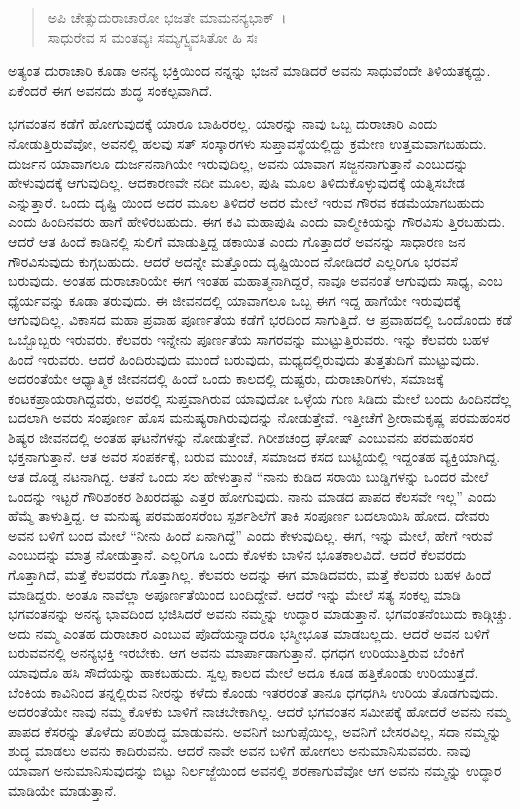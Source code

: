 \begin{verse}
ಅಪಿ ಚೇತ್ಸುದುರಾಚಾರೋ ಭಜತೇ ಮಾಮನನ್ಯಭಾಕ್~।\\ಸಾಧುರೇವ ಸ ಮಂತವ್ಯಃ ಸಮ್ಯಗ್ವ್ಯವಸಿತೋ ಹಿ ಸಃ 
\end{verse}

{\small ಅತ್ಯಂತ ದುರಾಚಾರಿ ಕೂಡಾ ಅನನ್ಯ ಭಕ್ತಿಯಿಂದ ನನ್ನನ್ನು ಭಜನೆ ಮಾಡಿದರೆ ಅವನು ಸಾಧುವೆಂದೇ ತಿಳಿಯತಕ್ಕದ್ದು. ಏಕೆಂದರೆ ಈಗ ಅವನದು ಶುದ್ಧ ಸಂಕಲ್ಪವಾಗಿದೆ.}

ಭಗವಂತನ ಕಡೆಗೆ ಹೋಗುವುದಕ್ಕೆ ಯಾರೂ ಬಾಹಿರರಲ್ಲ. ಯಾರನ್ನು ನಾವು ಒಬ್ಬ ದುರಾಚಾರಿ ಎಂದು ನೋಡುತ್ತಿರುವೆವೋ, ಅವನಲ್ಲಿ ಹಲವು ಸತ್ ಸಂಸ್ಕಾರಗಳು ಸುಪ್ತಾವಸ್ಥೆಯಲ್ಲಿದ್ದು ಕ್ರಮೇಣ ಉತ್ತಮವಾಗಬಹುದು. ದುರ್ಜನ ಯಾವಾಗಲೂ ದುರ್ಜನನಾಗಿಯೇ ಇರುವುದಿಲ್ಲ, ಅವನು ಯಾವಾಗ ಸಜ್ಜನನಾಗುತ್ತಾನೆ ಎಂಬುದನ್ನು ಹೇಳುವುದಕ್ಕೆ ಆಗುವುದಿಲ್ಲ. ಆದಕಾರಣವೇ ನದೀ ಮೂಲ, ಪುಷಿ ಮೂಲ ತಿಳಿದುಕೊಳ್ಳುವುದಕ್ಕೆ ಯತ್ನಿಸಬೇಡ ಎನ್ನುತ್ತಾರೆ. ಒಂದು ದೃಷ್ಟಿ ಯಿಂದ ಅದರ ಮೂಲ ತಿಳಿದರೆ ಅದರ ಮೇಲೆ ಇರುವ ಗೌರವ ಕಡಮೆಯಾಗಬಹುದು ಎಂದು ಹಿಂದಿನವರು ಹಾಗೆ ಹೇಳಿರಬಹುದು. ಈಗ ಕವಿ ಮಹಾಪುಷಿ ಎಂದು ವಾಲ್ಮೀಕಿಯನ್ನು ಗೌರವಿಸು ತ್ತಿರಬಹುದು. ಆದರೆ ಆತ ಹಿಂದೆ ಕಾಡಿನಲ್ಲಿ ಸುಲಿಗೆ ಮಾಡುತ್ತಿದ್ದ ಡಕಾಯಿತ ಎಂದು ಗೊತ್ತಾದರೆ ಅವನನ್ನು ಸಾಧಾರಣ ಜನ ಗೌರವಿಸುವುದು ಕುಗ್ಗಬಹುದು. ಆದರೆ ಅದನ್ನೇ ಮತ್ತೊಂದು ದೃಷ್ಟಿಯಿಂದ ನೋಡಿದರೆ ಎಲ್ಲರಿಗೂ ಭರವಸೆ ಬರುವುದು. ಅಂತಹ ದುರಾಚಾರಿಯೇ ಈಗ ಇಂತಹ ಮಹಾತ್ಮನಾಗಿದ್ದರೆ, ನಾವೂ ಅವನಂತೆ ಆಗುವುದು ಸಾಧ್ಯ, ಎಂಬ ಧ್ಯೆರ್ಯವನ್ನು ಕೂಡಾ ತರುವುದು. ಈ ಜೀವನದಲ್ಲಿ ಯಾವಾಗಲೂ ಒಬ್ಬ ಈಗ ಇದ್ದ ಹಾಗೆಯೇ ಇರುವುದಕ್ಕೆ ಆಗುವುದಿಲ್ಲ. ವಿಕಾಸದ ಮಹಾ ಪ್ರವಾಹ ಪೂರ್ಣತೆಯ ಕಡೆಗೆ ಭರದಿಂದ ಸಾಗುತ್ತಿದೆ. ಆ ಪ್ರವಾಹದಲ್ಲಿ ಒಂದೊಂದು ಕಡೆ ಒಬ್ಬೊಬ್ಬರು ಇರುವರು. ಕೆಲವರು ಇನ್ನೇನು ಪೂರ್ಣತೆಯ ಸಾಗರವನ್ನು ಮುಟ್ಟುತ್ತಿರುವರು. ಇನ್ನು ಕೆಲವರು ಬಹಳ ಹಿಂದೆ ಇರುವರು. ಆದರೆ ಹಿಂದಿರುವುದು ಮುಂದೆ ಬರುವುದು, ಮಧ್ಯದಲ್ಲಿರುವುದು ತುತ್ತತುದಿಗೆ ಮುಟ್ಟುವುದು. ಅದರಂತೆಯೇ ಆಧ್ಯಾತ್ಮಿಕ ಜೀವನದಲ್ಲಿ ಹಿಂದೆ ಒಂದು ಕಾಲದಲ್ಲಿ ದುಷ್ಟರು, ದುರಾಚಾರಿಗಳು, ಸಮಾಜಕ್ಕೆ ಕಂಟಕಪ್ರಾಯರಾಗಿದ್ದವರು, ಅವರಲ್ಲಿ ಸುಪ್ತವಾಗಿರುವ ಯಾವುದೋ ಒಳ್ಳೆಯ ಗುಣ ಸಿಡಿದು ಮೇಲೆ ಬಂದು ಹಿಂದಿನದೆಲ್ಲ ಬದಲಾಗಿ ಅವರು ಸಂಪೂರ್ಣ ಹೊಸ ಮನುಷ್ಯರಾಗಿರುವುದನ್ನು ನೋಡುತ್ತೇವೆ. ಇತ್ತೀಚೆಗೆ ಶ‍್ರೀರಾಮಕೃಷ್ಣ ಪರಮಹಂಸರ ಶಿಷ್ಯರ ಜೀವನದಲ್ಲಿ ಅಂತಹ ಘಟನೆಗಳನ್ನು ನೋಡುತ್ತೇವೆ. ಗಿರೀಶಚಂದ್ರ ಘೋಷ್ ಎಂಬುವನು ಪರಮಹಂಸರ ಭಕ್ತನಾಗುತ್ತಾನೆ. ಆತ ಅವರ ಸಂಪರ್ಕಕ್ಕೆ, ಬರುವ ಮುಂಚೆ, ಸಮಾಜದ ಕಸದ ಬುಟ್ಟಿಯಲ್ಲಿ ಇದ್ದಂತಹ ವ್ಯಕ್ತಿಯಾಗಿದ್ದ. ಆತ ದೊಡ್ಡ ನಟನಾಗಿದ್ದ. ಆತನೆ ಒಂದು ಸಲ ಹೇಳುತ್ತಾನೆ “ನಾನು ಕುಡಿದ ಸರಾಯಿ ಬುಡ್ಡಿಗಳನ್ನು ಒಂದರ ಮೇಲೆ ಒಂದನ್ನು ಇಟ್ಟರೆ ಗೌರಿಶಂಕರ ಶಿಖರದಷ್ಟು ಎತ್ತರ ಹೋಗುವುದು. ನಾನು ಮಾಡದ ಪಾಪದ ಕೆಲಸವೇ ಇಲ್ಲ” ಎಂದು ಹೆಮ್ಮೆ ತಾಳುತ್ತಿದ್ದ. ಆ ಮನುಷ್ಯ ಪರಮಹಂಸರೆಂಬ ಸ್ಪರ್ಶಶಿಲೆಗೆ ತಾಕಿ ಸಂಪೂರ್ಣ ಬದಲಾಯಿಸಿ ಹೋದ. ದೇವರು ಅವನ ಬಳಿಗೆ ಬಂದ ಮೇಲೆ “ನೀನು ಹಿಂದೆ ಏನಾಗಿದ್ದೆ” ಎಂದು ಕೇಳುವುದಿಲ್ಲ. ಈಗ, ಇನ್ನು ಮೇಲೆ, ಹೇಗೆ ಇರುವೆ ಎಂಬುದನ್ನು ಮಾತ್ರ ನೋಡುತ್ತಾನೆ. ಎಲ್ಲರಿಗೂ ಒಂದು ಕೊಳಕು ಬಾಳಿನ ಭೂತಕಾಲವಿದೆ. ಆದರೆ ಕೆಲವರದು ಗೊತ್ತಾಗಿದೆ, ಮತ್ತೆ ಕೆಲವರದು ಗೊತ್ತಾಗಿಲ್ಲ. ಕೆಲವರು ಅದನ್ನು ಈಗ ಮಾಡಿದವರು, ಮತ್ತೆ ಕೆಲವರು ಬಹಳ ಹಿಂದೆ ಮಾಡಿದ್ದರು. ಅಂತೂ ನಾವೆಲ್ಲಾ ಅಪೂರ್ಣತೆಯಿಂದ ಬಂದಿದ್ದೇವೆ. ಆದರೆ ಇನ್ನು ಮೇಲೆ ಸತ್ಯ ಸಂಕಲ್ಪ ಮಾಡಿ ಭಗವಂತನನ್ನು ಅನನ್ಯ ಭಾವದಿಂದ ಭಜಿಸಿದರೆ ಅವನು ನಮ್ಮನ್ನು ಉದ್ಧಾರ ಮಾಡುತ್ತಾನೆ. ಭಗವಂತನೆಂಬುದು ಕಾಡ್ಗಿಚ್ಚು. ಅದು ನಮ್ಮ ಎಂತಹ ದುರಾಚಾರ ಎಂಬುವ ಪೊದೆಯನ್ನಾದರೂ ಭಸ್ಮೀಭೂತ ಮಾಡಬಲ್ಲದು. ಆದರೆ ಅವನ ಬಳಿಗೆ ಬರುವವನಲ್ಲಿ ಅನನ್ಯಭಕ್ತಿ ಇರಬೇಕು. ಆಗ ಅವನು ಮಾರ್ಪಾಡಾಗುತ್ತಾನೆ. ಧಗಧಗ ಉರಿಯುತ್ತಿರುವ ಬೆಂಕಿಗೆ ಯಾವುದೊ ಹಸಿ ಸೌದೆಯನ್ನು ಹಾಕಬಹುದು. ಸ್ವಲ್ಪ ಕಾಲದ ಮೇಲೆ ಅದೂ ಕೂಡ ಹತ್ತಿಕೊಂಡು ಉರಿಯುತ್ತದೆ. ಬೆಂಕಿಯ ಕಾವಿನಿಂದ ತನ್ನಲ್ಲಿರುವ ನೀರನ್ನು ಕಳೆದು ಕೊಂಡು ಇತರರಂತೆ ತಾನೂ ಧಗಧಗಿಸಿ ಉರಿಯ ತೊಡಗುವುದು. ಅದರಂತೆಯೇ ನಾವು ನಮ್ಮ ಕೊಳಕು ಬಾಳಿಗೆ ನಾಚಬೇಕಾಗಿಲ್ಲ. ಆದರೆ ಭಗವಂತನ ಸಮೀಪಕ್ಕೆ ಹೋದರೆ ಅವನು ನಮ್ಮ ಪಾಪದ ಕೆಸರನ್ನು ತೊಳೆದು ಪರಿಶುದ್ಧ ಮಾಡುವನು. ಅವನಿಗೆ ಜುಗುಪ್ಸೆಯಿಲ್ಲ, ಅವನಿಗೆ ಬೇಸರವಿಲ್ಲ, ಸದಾ ನಮ್ಮನ್ನು ಶುದ್ಧ ಮಾಡಲು ಅವನು ಕಾದಿರುವನು. ಆದರೆ ನಾವೇ ಅವನ ಬಳಿಗೆ ಹೋಗಲು ಅನುಮಾನಿಸುವವರು. ನಾವು ಯಾವಾಗ ಅನುಮಾನಿಸುವುದನ್ನು ಬಿಟ್ಟು ನಿರ್ಲಜ್ಜೆಯಿಂದ ಅವನಲ್ಲಿ ಶರಣಾಗುವೆವೋ ಆಗ ಅವನು ನಮ್ಮನ್ನು ಉದ್ಧಾರ ಮಾಡಿಯೇ ಮಾಡುತ್ತಾನೆ.

